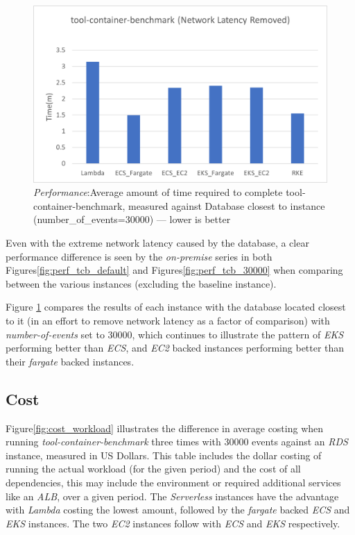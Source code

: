 \begin{figure}[htbp]
  \includegraphics[width=\textwidth]{images/perf-tcb_network.png}
  \caption{\emph{Performance}:Average amount of time required to complete tool-container-benchmark, measured against Database closest to instance 
  (number\_of\_events=30000) --- lower is better}
  \label{fig:perf_tcb_network}
\end{figure}

Even with the extreme network latency caused by the database, a clear performance difference is seen by the \textit{on-premise} series in both Figures\ref{fig:perf_tcb_default} and Figures\ref{fig:perf_tcb_30000}
when comparing between the various instances (excluding the baseline instance).

Figure \ref{fig:perf_tcb_network} compares the results of each instance with the database located closest to it (in an effort to remove network latency as a factor of comparison) with \textit{number-of-events} set to 30000,
which continues to illustrate the pattern of \textit{EKS} performing better than \textit{ECS},
and \textit{EC2} backed instances performing better than their \textit{fargate} backed instances.


\subsection{Cost}
Figure\ref{fig:cost_workload} illustrates the difference in average costing when running \emph{tool-container-benchmark} three times with 30000 events against an \textit{RDS} instance, measured in US Dollars.
This table includes the dollar costing of running the actual workload (for the given period) and the cost of all dependencies,
this may include the environment or required additional services like an \textit{ALB}, over a given period.
The \textit{Serverless} instances have the advantage with \textit{Lambda} costing the lowest amount, followed by the \textit{fargate} backed \textit{ECS} and \textit{EKS} instances.
The two \textit{EC2} instances follow with \textit{ECS} and \textit{EKS} respectively.

